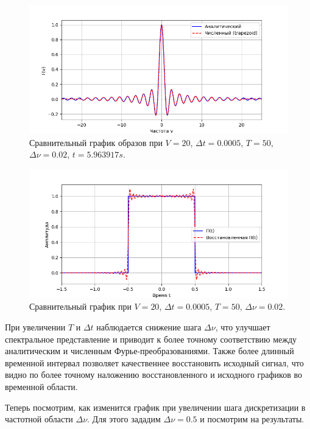 \documentclass[a4paper]{article}
\begin{document}
\begin{figure}[H]
  \centering
  \includegraphics[width=\textwidth]{src/task_1_1/freq_50_0.0005_20_0.02.png}
  \caption{Сравнительный график образов при $V=20$, $\Delta t=0.0005$, $T=50$, $\Delta \nu=0.02$, $t=5.963917 s$.} 
\end{figure}
\begin{figure}[H]
  \centering
  \includegraphics[width=\textwidth]{src/task_1_1/time_50_0.0005_20_0.02.png}
  \caption{Сравнительный график при $V=20$, $\Delta t=0.0005$, $T=50$, $\Delta \nu=0.02$.} 
\end{figure}

\noindent При увеличении $T$ и $\Delta t$ наблюдается снижение шага $\Delta \nu$, что улучшает спектральное представление и приводит к более точному соответствию между аналитическим и численным Фурье-преобразованиями. Также более длинный временной интервал позволяет качественнее восстановить исходный сигнал, что видно по более точному наложению восстановленного и исходного графиков во временной области. 

Теперь посмотрим, как изменится график при увеличении шага дискретизации в частотной области $\Delta \nu$. Для этого зададим $\Delta \nu=0.5$ и посмотрим на результаты.  
\end{document}
